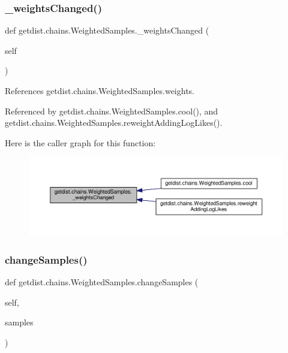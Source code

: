 \subsubsection{\texorpdfstring{\+\_\+weights\+Changed()}{\_weightsChanged()}}
{\footnotesize\ttfamily def getdist.\+chains.\+Weighted\+Samples.\+\_\+weights\+Changed (\begin{DoxyParamCaption}\item[{}]{self }\end{DoxyParamCaption})\hspace{0.3cm}{\ttfamily [private]}}



References getdist.\+chains.\+Weighted\+Samples.\+weights.



Referenced by getdist.\+chains.\+Weighted\+Samples.\+cool(), and getdist.\+chains.\+Weighted\+Samples.\+reweight\+Adding\+Log\+Likes().

Here is the caller graph for this function\+:
\nopagebreak
\begin{figure}[H]
\begin{center}
\leavevmode
\includegraphics[width=350pt]{classgetdist_1_1chains_1_1WeightedSamples_a703edf346f9300d9251c0f7be93d6276_icgraph}
\end{center}
\end{figure}
\mbox{\label{classgetdist_1_1chains_1_1WeightedSamples_a653635d220dbf602c06118de80e224fe}} 
\subsubsection{\texorpdfstring{change\+Samples()}{changeSamples()}}
{\footnotesize\ttfamily def getdist.\+chains.\+Weighted\+Samples.\+change\+Samples (\begin{DoxyParamCaption}\item[{}]{self,  }\item[{}]{samples }\end{DoxyParamCaption})}

